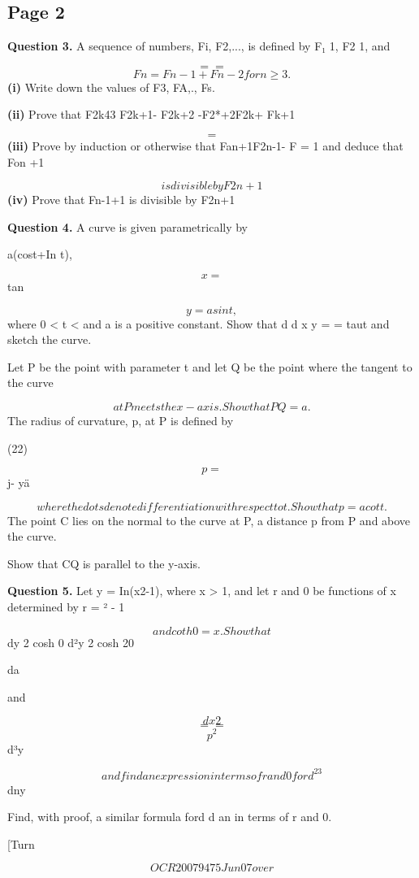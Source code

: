 \documentclass[12pt]{article}
\begin{document}
\subsection*{Page 2}
\begin{flushleft}
\bigskip\textbf{Question 3.} A sequence of numbers, Fi, F2,..., is defined by F₁ 1, F2 1, and\par
\[= =\]
\[Fn= Fn-1+ Fn-2 for n \geq 3.\]
\textbf{(i)} Write down the values of F3, FA,., Fs.\par
\textbf{(ii)} Prove that F2k43 F2k+1- F2k+2 -F2*+2F2k+ Fk+1\par
\[=\]
\textbf{(iii)} Prove by induction or otherwise that Fan+1F2n-1- F = 1 and deduce that Fon +1\par
\[is divisible by F2n+1\]
\textbf{(iv)} Prove that Fn-1+1 is divisible by F2n+1\par
\bigskip\textbf{Question 4.} A curve is given parametrically by\par
a(cost+In t),\par
\[x =\]
tan\par
\[y = a sint,\]
where 0 < t < and a is a positive constant. Show that d d x y = = taut and sketch the curve.\par
Let P be the point with parameter t and let Q be the point where the tangent to the curve\par
\[at P meets the x-axis. Show that PQ = a.\]
The radius of curvature, p, at P is defined by\par
(22)\par
\[p=\]
j- yä\par
\[where the dots denote differentiation with respect to t. Show that p = a cot t.\]
The point C lies on the normal to the curve at P, a distance p from P and above the curve.\par
Show that CQ is parallel to the y-axis.\par
\bigskip\textbf{Question 5.} Let y = In(x2-1), where x > 1, and let r and 0 be functions of x determined by r = \sqrtx² - 1\par
\[and coth0 = x. Show that\]
dy 2 cosh 0 d²y 2 cosh 20\par
da\par
and\par
\[dx2\]
\[==\]
\[p^2\]
d³y\par
\[and find an expression in terms of r and 0 for d^23\]
dny\par
Find, with proof, a similar formula ford d an in terms of r and 0.\par
[Turn\par
\[OCR 2007 9475 Jun07 over\]
\end{flushleft}
\end{document}
